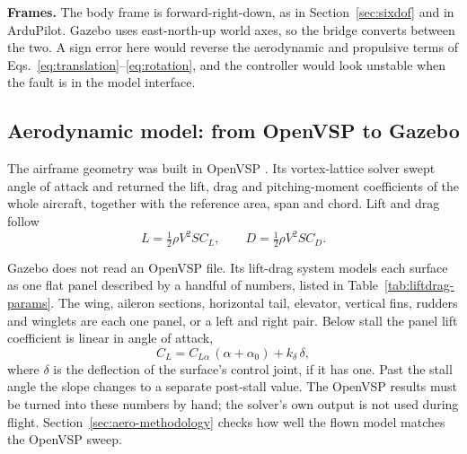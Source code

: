 \documentclass{article}
\begin{document}
\textbf{Frames.} The body frame is forward-right-down, as in Section~\ref{sec:sixdof} and in ArduPilot. Gazebo uses east-north-up world axes, so the bridge converts between the two. A sign error here would reverse the aerodynamic and propulsive terms of Eqs.~\eqref{eq:translation}--\eqref{eq:rotation}, and the controller would look unstable when the fault is in the model interface.

\subsection{Aerodynamic model: from OpenVSP to Gazebo}
\label{sec:aero-model-method}
The airframe geometry was built in OpenVSP \citep{openvspdocs}. Its vortex-lattice solver swept angle of attack and returned the lift, drag and pitching-moment coefficients of the whole aircraft, together with the reference area, span and chord. Lift and drag follow
\begin{equation}
    L=\tfrac{1}{2}\rho V^{2}SC_{L},\qquad D=\tfrac{1}{2}\rho V^{2}SC_{D}.
\end{equation}

Gazebo does not read an OpenVSP file. Its lift-drag system models each surface as one flat panel described by a handful of numbers, listed in Table~\ref{tab:liftdrag-params}. The wing, aileron sections, horizontal tail, elevator, vertical fins, rudders and winglets are each one panel, or a left and right pair. Below stall the panel lift coefficient is linear in angle of attack,
\begin{equation}
    C_L = C_{L\alpha}\,(\alpha+\alpha_0) + k_\delta\,\delta ,
    \label{eq:gazebo-lift}
\end{equation}
where $\delta$ is the deflection of the surface's control joint, if it has one. Past the stall angle the slope changes to a separate post-stall value. The OpenVSP results must be turned into these numbers by hand; the solver's own output is not used during flight. Section~\ref{sec:aero-methodology} checks how well the flown model matches the OpenVSP sweep.
\end{document}
